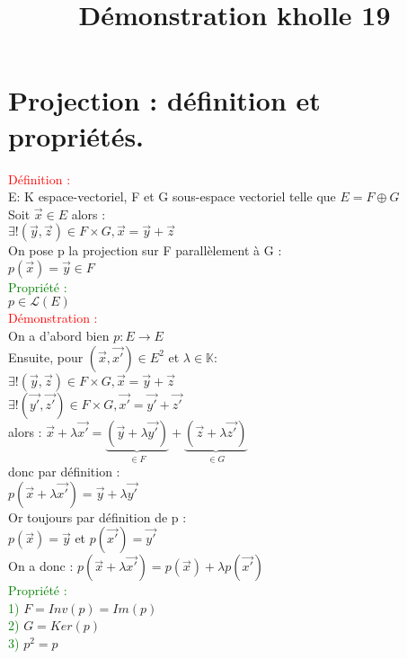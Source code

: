 \documentclass{article}
\begin{document}
\title{Démonstration kholle 19}
\date{}
\maketitle
	\renewcommand{\thesection}{\Roman{section}}
	\setlength{\parindent}{1.5cm}
\section{Projection : définition et propriétés.}
\textcolor{red}{Définition :} \\
E: K espace-vectoriel, F et G sous-espace vectoriel telle que $E= F \oplus G$ \\ 
Soit $\vec{x} \in E$ alors : \\ 
$\exists!(\vec{y},\vec{z}) \in F \times G, \vec{x}=\vec{y}+ \vec{z}$ \\ 
On pose p la projection sur F parallèlement à G : \\ 
$p(\vec{x})= \vec{y} \in F$ \\ 
\textcolor{green}{Propriété :} \\ 
$p \in \mathcal{L}(E)$ \\ 
\textcolor{red}{Démonstration :} \\ 
On a d'abord bien $p: E \longrightarrow E$ \\ 
Ensuite, pour $(\vec{x},\vec{x'}) \in E^2$ et $\lambda \in \mathbb{K}$: \\ 
$\exists!(\vec{y},\vec{z}) \in F \times G, \vec{x}=\vec{y}+ \vec{z}$ \\ 
$\exists!(\vec{y'},\vec{z'}) \in F \times G, \vec{x'}=\vec{y'}+ \vec{z'}$ \\ 
alors : $\vec{x} +\lambda \vec{x'}=\underbrace{(\vec{y}+\lambda \vec{y'})}_{\in F}+\underbrace{(\vec{z} + \lambda \vec{z'})}_{\in G}$ \\ 
donc par définition : \\ 
$p(\vec{x}+ \lambda \vec{x'})=\vec{y}+ \lambda \vec{y'}$ \\ 
Or toujours par définition de p : \\ 
$p(\vec{x})= \vec{y}$ et $p(\vec{x'})= \vec{y'}$ \\ 
On a donc : $p(\vec{x}+ \lambda \vec{x'})=p(\vec{x})+ \lambda p(\vec{x'})$ \\ 
\textcolor{green}{Propriété :} \\ 
\textcolor{green}{1)} $F=Inv(p)=Im(p)$ \\ 
\textcolor{green}{2)} $G=Ker(p)$ \\ 
\textcolor{green}{3)} $p^2=p$ \\ 
\end{document}
